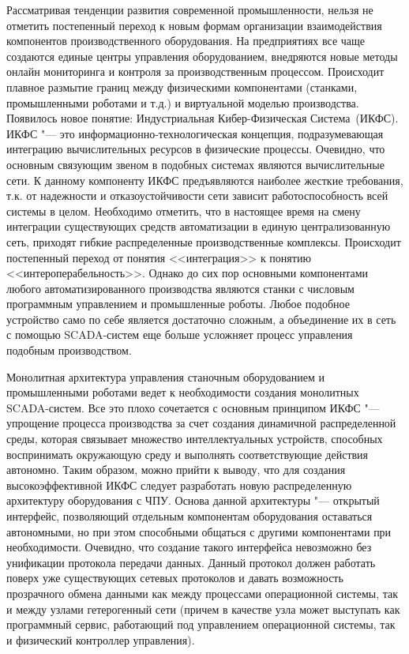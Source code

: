 
{\actuality} Рассматривая тенденции развития современной промышленности, нельзя не отметить постепенный переход к новым формам организации взаимодействия компонентов производственного оборудования. На предприятиях все чаще создаются единые центры управления оборудованием, внедряются новые методы онлайн мониторинга и контроля за производственным процессом. Происходит плавное размытие границ между физическими компонентами (станками, промышленными роботами и т.\:д.) и виртуальной моделью производства. Появилось новое понятие: Индустриальная Кибер-Физическая Система~(ИКФС). ИКФС "--- это информационно-технологическая концепция, подразумевающая интеграцию вычислительных ресурсов в физические процессы. Очевидно, что основным связующим звеном в подобных системах являются вычислительные сети. К данному компоненту ИКФС предъявляются наиболее жесткие требования, т.\:к. от надежности и отказоустойчивости сети зависит работоспособность всей системы в целом. Необходимо отметить, что в настоящее время на смену интеграции существующих средств автоматизации в единую централизованную сеть, приходят гибкие распределенные производственные комплексы. Происходит постепенный переход от понятия <<интеграция>> к понятию <<интероперабельность>>. Однако до сих пор основными компонентами любого автоматизированного производства являются станки с числовым программным управлением и промышленные роботы. Любое подобное устройство само по себе является достаточно сложным, а объединение их в сеть с помощью SCADA-систем еще больше усложняет процесс управления подобным производством.

Монолитная архитектура управления станочным оборудованием и промышленными роботами ведет к необходимости создания монолитных SCADA-систем. Все это плохо сочетается с основным принципом ИКФС "--- упрощение процесса производства за счет создания динамичной распределенной среды, которая связывает множество интеллектуальных устройств, способных воспринимать окружающую среду и выполнять соответствующие действия автономно.  Таким образом, можно прийти к выводу, что для создания высокоэффективной ИКФС следует разработать новую распределенную архитектуру оборудования с ЧПУ.  Основа данной архитектуры "--- открытый интерфейс, позволяющий отдельным компонентам оборудования оставаться автономными, но при этом способными общаться с другими компонентами при необходимости. Очевидно, что создание такого интерфейса невозможно без унификации протокола передачи данных. Данный протокол должен работать поверх уже существующих сетевых протоколов и давать возможность прозрачного обмена данными как между процессами операционной системы, так и между узлами гетерогенный сети (причем в качестве узла может выступать как программный сервис, работающий под управлением операционной системы, так и физический контроллер управления).

